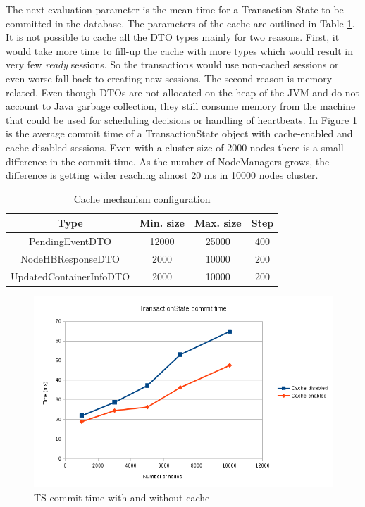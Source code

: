 The next evaluation parameter is the mean time for a Transaction State
to be committed in the database. The parameters of the cache are
outlined in Table \ref{tab:ev_cache_conf}. It is not possible to cache
all the DTO types mainly for two reasons. First, it would take more
time to fill-up the cache with more types which would result in
very few \emph{ready} sessions. So the transactions would use
non-cached sessions or even worse fall-back to creating new
sessions. The second reason is memory related. Even though DTOs are
not allocated on the heap of the JVM and do not account to Java
garbage collection, they still consume memory from the machine that
could be used for scheduling decisions or handling of heartbeats. In
Figure \ref{fig:ev_cache_ts_commit} is the average commit time of a
TransactionState object with cache-enabled and cache-disabled
sessions. Even with a cluster size of 2000 nodes there is a small
difference in the commit time. As the number of NodeManagers grows,
the difference is getting wider reaching almost 20 ms in 10000 nodes
cluster.

\begin{table}
\centering
\begin{tabular}{| c | c | c | c |}
\hline
\textbf{Type} & \textbf{Min. size} & \textbf{Max. size} & \textbf{Step}\\
\hline
\hline
PendingEventDTO & 12000 & 25000 & 400\\
\hline
NodeHBResponseDTO & 2000 & 10000 & 200\\
\hline
UpdatedContainerInfoDTO & 2000 & 10000 & 200\\
\hline
\end{tabular}
\caption{Cache mechanism configuration}
\label{tab:ev_cache_conf}
\end{table}

\begin{figure}
\centering
\includegraphics[scale=0.6]{resources/images/Evaluation/dto_cache_ts_commit.png}
\caption{TS commit time with and without cache}
\label{fig:ev_cache_ts_commit}
\end{figure}

